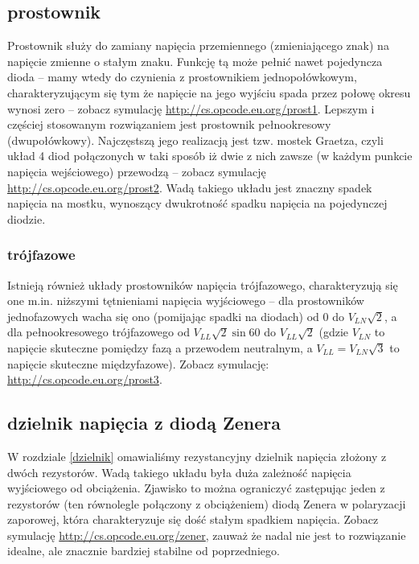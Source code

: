 
\subsection{prostownik}

Prostownik służy do zamiany napięcia przemiennego (zmieniającego znak) na napięcie zmienne o stałym znaku.
Funkcję tą może pełnić nawet pojedyncza dioda – mamy wtedy do czynienia z prostownikiem jednopołówkowym,
	charakteryzującym się tym że napięcie na jego wyjściu spada przez połowę okresu wynosi zero – zobacz symulację \url{http://cs.opcode.eu.org/prost1}.
Lepszym i częściej stosowanym rozwiązaniem jest prostownik pełnookresowy (dwupołówkowy). Najczęstszą jego realizacją jest tzw. mostek Graetza, czyli układ 4 diod połączonych w taki sposób iż dwie z nich zawsze (w każdym punkcie napięcia wejściowego) przewodzą – zobacz symulację \url{http://cs.opcode.eu.org/prost2}.
Wadą takiego układu jest znaczny spadek napięcia na mostku, wynoszący dwukrotność spadku napięcia na pojedynczej diodzie.

\subsubsection{trójfazowe }
Istnieją również układy prostowników napięcia trójfazowego, charakteryzują się one m.in. niższymi tętnieniami napięcia wyjściowego – dla prostowników jednofazowych wacha się ono (pomijając spadki na diodach) od $0$ do $V_{LN}\sqrt{2}$, a dla pełnookresowego trójfazowego od $V_{LL}\sqrt{2}\sin{60}$ do $V_{LL}\sqrt{2}$ (gdzie $V_{LN}$ to napięcie skuteczne pomiędzy fazą a przewodem neutralnym, a $V_{LL} = V_{LN}\sqrt{3}$ to napięcie skuteczne międzyfazowe). Zobacz symulację: \url{http://cs.opcode.eu.org/prost3}.

\subsection{dzielnik napięcia z diodą Zenera}

W rozdziale \ref{dzielnik} omawialiśmy rezystancyjny dzielnik napięcia złożony z dwóch rezystorów. Wadą takiego układu była duża zależność napięcia wyjściowego od obciążenia. Zjawisko to można ograniczyć zastępując jeden z rezystorów (ten równolegle połączony z obciążeniem) diodą Zenera w polaryzacji zaporowej, która charakteryzuje się dość stałym spadkiem napięcia. Zobacz symulację \url{http://cs.opcode.eu.org/zener}, zauważ że nadal nie jest to rozwiązanie idealne, ale znacznie bardziej stabilne od poprzedniego.

